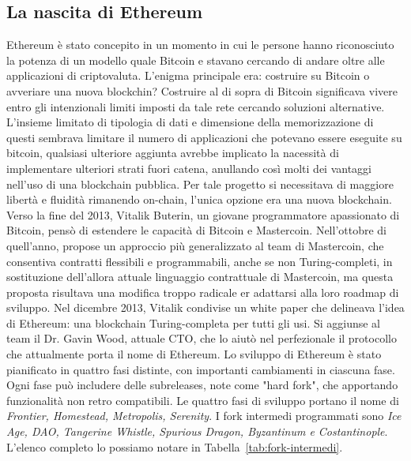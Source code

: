 \subsection*{La nascita di Ethereum}
Ethereum è stato concepito in un momento in cui le persone hanno riconosciuto la potenza di un modello quale Bitcoin e stavano cercando di andare oltre alle applicazioni di criptovaluta. L'enigma principale era: costruire su Bitcoin o avveriare una nuova blockchin? Costruire al di sopra di Bitcoin significava vivere entro gli intenzionali limiti imposti da tale rete cercando soluzioni alternative. L'insieme limitato di tipologia di dati e dimensione della memorizzazione di questi sembrava limitare il numero di applicazioni che potevano essere eseguite su bitcoin, qualsiasi ulteriore aggiunta avrebbe implicato la nacessità di implementare ulteriori strati fuori catena, anullando così molti dei vantaggi nell'uso di una blockchain pubblica. Per tale progetto si necessitava di maggiore libertà e fluidità rimanendo on-chain, l'unica opzione era una nuova blockchain.
Verso la fine del 2013, Vitalik Buterin, un giovane programmatore apassionato di Bitcoin, pensò di estendere le capacità di Bitcoin e Mastercoin. Nell'ottobre di quell'anno, propose un approccio più generalizzato al team di Mastercoin, che consentiva contratti flessibili e programmabili, anche se non Turing-completi, in sostituzione dell'allora attuale linguaggio contrattuale di Mastercoin, ma questa proposta risultava una modifica troppo radicale er adattarsi alla loro roadmap di sviluppo. 
Nel dicembre 2013, Vitalik condivise un white paper che delineava l'idea di Ethereum: una blockchain Turing-completa per tutti gli usi. Si aggiunse al team  il Dr. Gavin Wood, attuale CTO, che lo aiutò nel perfezionale il protocollo che attualmente porta il nome di Ethereum. 
Lo sviluppo di Ethereum è stato pianificato in quattro fasi distinte, con importanti cambiamenti in ciascuna fase. Ogni fase può includere delle subreleases, note come "hard fork", che apportando funzionalità non retro compatibili. Le quattro fasi di sviluppo portano il nome di \textit{Frontier, Homestead, Metropolis, Serenity}. I fork intermedi programmati sono \textit{Ice Age, DAO, Tangerine Whistle, Spurious Dragon, Byzantinum e Costantinople}. L'elenco completo lo possiamo notare in Tabella~\ref{tab:fork-intermedi}.
%
